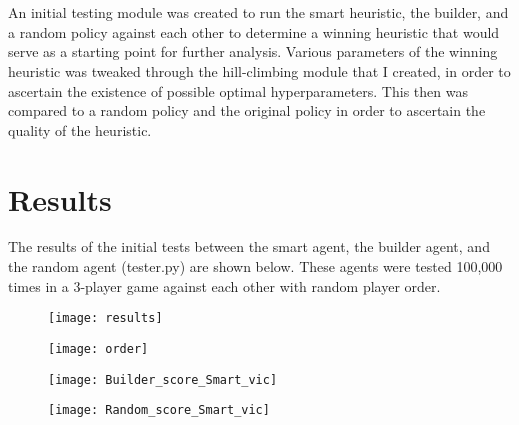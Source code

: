 \documentclass[a4paper, 11pt]{article}
\begin{document}
\\ \\
\noindent An initial testing module was created to run the smart heuristic, the builder, and a random policy against each other to determine a winning heuristic that would serve as a starting point for further analysis. Various parameters of the winning heuristic was tweaked through the hill-climbing module that I created, in order to ascertain the existence of possible optimal hyperparameters. This then was compared to a random policy and the original policy in order to ascertain the quality of the heuristic.

\section{Results}

The results of the initial tests between the smart agent, the builder agent, and the random agent (tester.py) are shown below. These agents were tested 100,000 times in a 3-player game against each other with random player order.

\clearpage

\begin{figure}
\centering
\begin{minipage}{.5\textwidth}
  \centering
  \texttt{[image: results]}
  \label{fig:test1}
\end{minipage}%
\begin{minipage}{.5\textwidth}
  \centering
  \texttt{[image: order]}
  \label{fig:test2}
\end{minipage}
\end{figure}

\begin{figure}
\centering
\begin{minipage}{.5\textwidth}
  \centering
  \texttt{[image: Builder\_score\_Smart\_vic]}
  \label{fig:test1}
\end{minipage}%
\begin{minipage}{.5\textwidth}
  \centering
  \texttt{[image: Random\_score\_Smart\_vic]}
  \label{fig:test2}
\end{minipage}
\end{figure}
\end{document}
